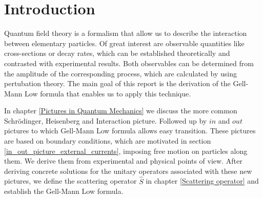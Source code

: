 \documentclass[
11pt, %
english, %
singlespacing, %
headsepline, %
]{MastersDoctoralThesis} %
\begin{document}
\chapter{Introduction}\label{Introduction}
Quantum field theory is a formalism that allow us to describe the interaction between elementary particles. Of great interest are observable quantities like cross-sections or decay rates, which can be established theoretically and contrasted with experimental results. Both observables can be determined from the amplitude of the corresponding process, which are calculated by using pertubation theory. The main goal of this report is the derivation of the Gell-Mann Low formula that enables us  to apply this technique.
 
In chapter \ref{Pictures in Quantum Mechanics} we discuss the more common Schrödinger, Heisenberg and Interaction picture. Followed up by $ in $ and $ out $ pictures to which Gell-Mann Low formula allows easy transition. These pictures are based on boundary conditions, which are motivated in section \ref{in_out_picture_external_currents}, imposing free motion on particles along them. We derive them from experimental and physical points of view. After deriving concrete solutions for the unitary operators associated with these new pictures, we define the scattering operator $ \hat{S} $ in chapter \ref{Scattering operator} and establish the Gell-Mann Low formula.
\end{document}
